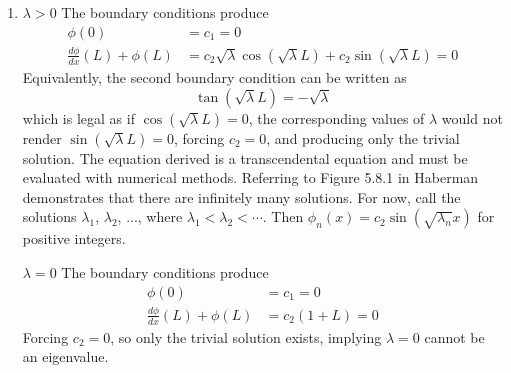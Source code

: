 \documentclass[a4paper]{article}
\begin{document}
\begin{enumerate}[label=(\alph*)]
	\begin{align*}
		c_{1} & = -C \sin\!\left(\sqrt{\lambda}a\right) \\
		c_{2} & = C \cos\!\left(\sqrt{\lambda}a\right)
	\end{align*}
	In the first row the combination of the two terms is clearly zero, and in the second, that is simply equal to the determinant, which we have established is zero. The corresponding eigenfunctions are
	\begin{align*}
		\phi \!\left( x \right) & = -C \sin\!\left(\sqrt{\lambda}a\right)\cos\!\left(\sqrt{\lambda}x\right) + C \cos\!\left(\sqrt{\lambda}a\right)\sin\!\left(\sqrt{\lambda}x\right) \\
					& = C \sin\!\left(\sqrt{\lambda}\!\left( x - a \right)\right) \\
					& = C \sin\!\left(\frac{n \pi \!\left( x - a \right)}{b - a}\right)
	\end{align*}
	\item \underline{\( \lambda > 0 \)} 
	The boundary conditions produce
	\begin{align*}
		\phi \!\left( 0 \right) & = c_{1} = 0 \\
		\frac{d \phi}{d x}\!\left( L \right) + \phi \!\left( L \right) & = c_{2}\sqrt{\lambda}\cos\!\left(\sqrt{\lambda}L\right) + c_{2}\sin\!\left(\sqrt{\lambda}L\right) = 0
	\end{align*}
	Equivalently, the second boundary condition can be written as 
	\[
		\tan\!\left(\sqrt{\lambda}L\right) = -\sqrt{\lambda} 
	\]
	which is legal as if \( \cos\!\left(\sqrt{\lambda}L\right) = 0 \), the corresponding values of \( \lambda \) would not render \( \sin\!\left(\sqrt{\lambda}L\right) = 0 \), forcing \( c_{2} = 0 \), and producing only the trivial solution. The equation derived is a transcendental equation and must be evaluated with numerical methods. Referring to Figure 5.8.1 in Haberman demonstrates that there are infinitely many solutions. For now, call the solutions \( \lambda_{1} \), \( \lambda_{2} \), ..., where \( \lambda_{1} < \lambda_{2} < \cdots \). Then \( \phi_{n} \!\left( x \right) = c_{2}\sin\!\left(\sqrt{\lambda_{n}}x\right) \) for positive integers.

	\underline{\( \lambda = 0 \)} 
	The boundary conditions produce
	\begin{align*}
		\phi \!\left( 0 \right) & = c_{1} = 0 \\
		\frac{d \phi}{d x}\!\left( L \right) + \phi \!\left( L \right) & = c_{2}\!\left( 1 + L \right) = 0
	\end{align*}
	Forcing \( c_{2} = 0 \), so only the trivial solution exists, implying \( \lambda = 0 \) cannot be an eigenvalue.
	

\end{enumerate}
\end{document}
